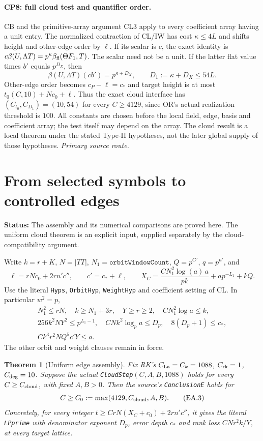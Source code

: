 \documentclass[11pt,a4paper]{article}
\numberwithin{equation}{section}
\newtheorem{theorem}{Theorem}[section]
\theoremstyle{remark}\newtheorem{remark}[theorem]{Remark}
\newcommand{\status}[1]{\textbf{Status:} #1}
\begin{document}
\paragraph{CP8: full cloud test and quantifier order.}
CB and the primitive-array argument CL3 apply to every coefficient
array having a unit entry. The normalized contraction of CL/IW has
cost $\kappa\le4L$ and shifts height and other-edge order by $\ell$.
If its scalar is $c$, the exact identity is
$c\beta(U,\Lambda T)=p^\kappa\beta_{\rm fl}(\Theta F_1,T)$.
The scalar need not be a unit. If the latter flat value times $b'$
equals $p^{D_X}$, then
\[
 \beta(U,\Lambda T)(cb')=p^{\kappa+D_X},\qquad
 D_1:=\kappa+D_X\le54L.                               \tag{CP.7}
\]
Other-edge order becomes $c_P-\ell=c_*$ and target height is at most
$t_0(C,10)+Nc_0+\ell$. Thus the exact cloud interface has
$(C_{t_0},C_{D_1})=(10,54)$ for every $C\ge4129$, since OR's actual
realization threshold is $100$. All constants are chosen before the local
field, edge, basis and coefficient array; the test itself may depend
on the array. The cloud result is a local theorem under the stated
Type-II hypotheses, not the later global supply of those hypotheses.
\noindent\textit{Primary source route.}\cite{cloud-actual}


\section{From selected symbols to controlled edges}\label{sec:edge-assembly}

\status{The assembly and its numerical comparisons are proved here. The
uniform cloud theorem is an explicit input, supplied separately by the
cloud-compatibility argument.}

Write $k=r+K$, $N=|TT|$, $N_1=\texttt{orbitWindowCount}$,
$Q=p^{G'}$, $q=p^{n'}$, and
\[
 \ell=rNc_0+2rn'c'',\qquad c'=c_*+\ell,\qquad
 X_C=\frac{CN_1^2\log(a)\,a}{pk}+ap^{-L_1}+kQ.
 \tag{EA.1}
\]
Use the literal \texttt{Hyps}, \texttt{OrbitHyp}, \texttt{WeightHyp} and
coefficient setting of CL. In particular $w^2=p$,
\[
\begin{gathered}
 N_1^2\le rN,\quad k\ge N_1+3r,\quad Y\ge r\ge2,
 \quad CN_1^2\log a\le k,\\
 256k^2NY^2\le p^{L_1-1},\quad CNk^2\log_p a\le D_p,
 \quad8(D_p+1)\le c_*,\\
 Ck^3r^2NQ^5c'Y\le a.
\end{gathered}\tag{EA.2}
\]
The other orbit and weight clauses remain in force.

\begin{theorem}[Uniform edge assembly]
Fix RK's $C_{\rm La}=C_k=1088$, $C_{\rm rk}=1$, $C_{\rm deg}=10$.
Suppose the actual \texttt{CloudStep}$(C,A,B,1088)$ holds for every
$C\ge C_{\rm cloud}$, with fixed $A,B>0$. Then the source's
\texttt{ConclusionE} holds for
\[
 C\ge C_0:=\max(4129,C_{\rm cloud},A,B).
 \tag{EA.3}
\]
Concretely, for every integer
$t\ge CrN(X_C+c_0)+2rn'c''$, it gives the literal
\texttt{LPprime} with denominator exponent $D_p$, error depth $c_*$ and
rank loss $CNr^2k/Y$, at every target lattice.
\end{theorem}
\end{document}
